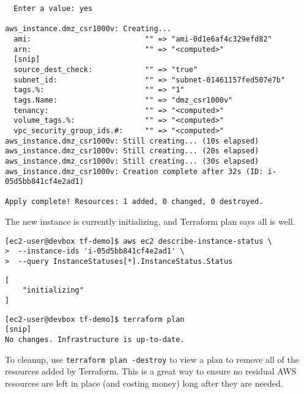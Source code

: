 \begin{verbatim}
  Enter a value: yes

aws_instance.dmz_csr1000v: Creating...
  ami:                          "" => "ami-0d1e6af4c329efd82"
  arn:                          "" => "<computed>"
  [snip]
  source_dest_check:            "" => "true"
  subnet_id:                    "" => "subnet-01461157fed507e7b"
  tags.%:                       "" => "1"
  tags.Name:                    "" => "dmz_csr1000v"
  tenancy:                      "" => "<computed>"
  volume_tags.%:                "" => "<computed>"
  vpc_security_group_ids.#:     "" => "<computed>"
aws_instance.dmz_csr1000v: Still creating... (10s elapsed)
aws_instance.dmz_csr1000v: Still creating... (20s elapsed)
aws_instance.dmz_csr1000v: Still creating... (30s elapsed)
aws_instance.dmz_csr1000v: Creation complete after 32s (ID: i-05d5bb841cf4e2ad1)

Apply complete! Resources: 1 added, 0 changed, 0 destroyed.
\end{verbatim}

The new instance is currently initializing, and Terraform plan says all is well.

\begin{verbatim}
[ec2-user@devbox tf-demo]$ aws ec2 describe-instance-status \
>  --instance-ids 'i-05d5bb841cf4e2ad1' \
>  --query InstanceStatuses[*].InstanceStatus.Status
\end{verbatim}

\begin{verbatim}
[
    "initializing"
]
\end{verbatim}

\begin{verbatim}
[ec2-user@devbox tf-demo]$ terraform plan
[snip]
No changes. Infrastructure is up-to-date.
\end{verbatim}

To cleanup, use \verb|terraform plan -destroy| to view a plan to remove all of the
resources added by Terraform. This is a great way to ensure no residual AWS
resources are left in place (and costing money) long after they are needed.


